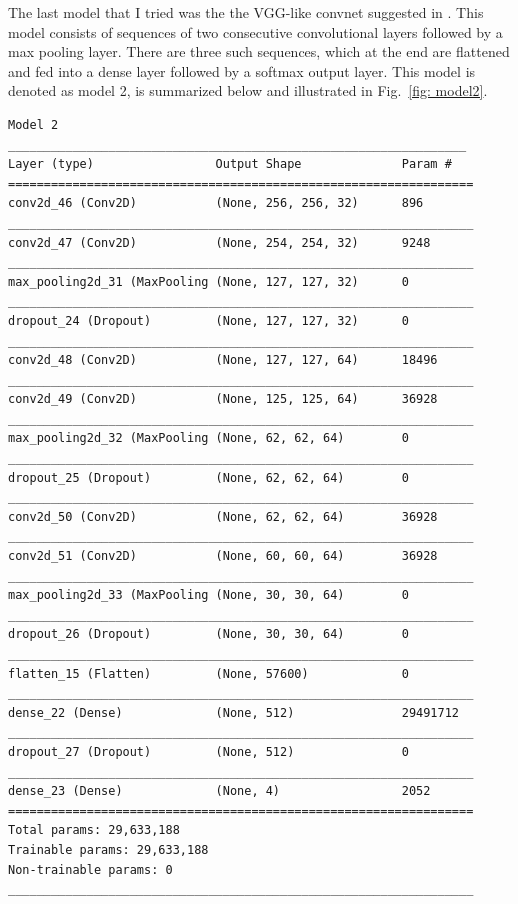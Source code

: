 \documentclass[10pt,a4paper]{article}
\begin{document}
\newpage
\noindent
The last model that I tried was the the VGG-like convnet suggested in \cite{KerasDocs}. This model consists of sequences of two consecutive convolutional layers followed by a max pooling layer. There are three such sequences, which at the end are flattened and fed into a dense layer followed by a softmax output layer. This model is denoted as model 2, is summarized below and illustrated in Fig.~\ref{fig: model2}.
\begin{lstlisting}
Model 2
________________________________________________________________
Layer (type)                 Output Shape              Param #   
=================================================================
conv2d_46 (Conv2D)           (None, 256, 256, 32)      896       
_________________________________________________________________
conv2d_47 (Conv2D)           (None, 254, 254, 32)      9248      
_________________________________________________________________
max_pooling2d_31 (MaxPooling (None, 127, 127, 32)      0         
_________________________________________________________________
dropout_24 (Dropout)         (None, 127, 127, 32)      0         
_________________________________________________________________
conv2d_48 (Conv2D)           (None, 127, 127, 64)      18496     
_________________________________________________________________
conv2d_49 (Conv2D)           (None, 125, 125, 64)      36928     
_________________________________________________________________
max_pooling2d_32 (MaxPooling (None, 62, 62, 64)        0         
_________________________________________________________________
dropout_25 (Dropout)         (None, 62, 62, 64)        0         
_________________________________________________________________
conv2d_50 (Conv2D)           (None, 62, 62, 64)        36928     
_________________________________________________________________
conv2d_51 (Conv2D)           (None, 60, 60, 64)        36928     
_________________________________________________________________
max_pooling2d_33 (MaxPooling (None, 30, 30, 64)        0         
_________________________________________________________________
dropout_26 (Dropout)         (None, 30, 30, 64)        0         
_________________________________________________________________
flatten_15 (Flatten)         (None, 57600)             0         
_________________________________________________________________
dense_22 (Dense)             (None, 512)               29491712  
_________________________________________________________________
dropout_27 (Dropout)         (None, 512)               0         
_________________________________________________________________
dense_23 (Dense)             (None, 4)                 2052      
=================================================================
Total params: 29,633,188
Trainable params: 29,633,188
Non-trainable params: 0
_________________________________________________________________
\end{lstlisting}
\end{document}
